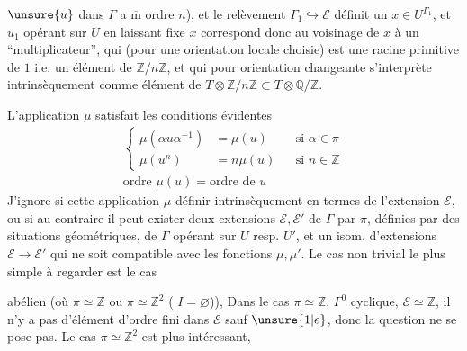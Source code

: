 
\(\unsure{u}\) dans \(\Gamma\) a \(\overline{\mathrm m}\) ordre \(n\)),
et le relèvement \(\Gamma_1\hookrightarrow\mathcal E\) définit un
\(x\in U^{\Gamma_1}\),  et \(u_1\) opérant sur \(U\)
en laissant fixe \(x\) correspond donc au voisinage de \(x\) à un
``multiplicateur'', qui (pour une orientation locale choisie) est une
racine primitive  de \(1\) i.e. un élément de
\(\mathbb Z/n\mathbb Z\), et qui pour orientation changeante
s'interprète intrinsèquement comme élément de
\(T\otimes\mathbb Z/n\mathbb Z
\subset T\otimes\mathbb Q/\mathbb Z\).

L'application \(\mu\) satisfait les conditions évidentes
\[
\begin{gathered}
\left\{
\begin{aligned}
\mu(\alpha u\alpha^{-1})&=\mu(u) &&\text{si }\alpha\in\pi\\
\mu(u^n)&=n\mu(u) &&\text{si }n\in\mathbb Z
\end{aligned}
\right.\\
\text{ordre }\mu(u)=\text{ordre de }u
\end{gathered}
\]
J'ignore si cette application \(\mu\) 
 définir intrinsèquement en termes de l'extension
\(\mathcal E\), ou si au contraire il peut exister deux extensions
 \(\mathcal E,\mathcal E'\) de \(\Gamma\) par \(\pi\),
définies par des situations géométriques, de \(\Gamma\) opérant sur
\(U\) resp. \(U'\), et un isom. d'extensions
\(\mathcal E\longrightarrow\mathcal E'\) qui ne soit compatible avec
les fonctions \(\mu,\mu'\).
Le cas non trivial le plus simple à regarder est le cas


abélien (où \(\pi\simeq\mathbb Z\)
ou \(\pi\simeq\mathbb Z^2\) ( \(I=\varnothing\))),
Dans le  cas
 \(\pi\simeq\mathbb Z\), 
\(\Gamma^0\) cyclique, \(\mathcal E\simeq\mathbb Z\),
il n'y a pas d'élément d'ordre fini dans \(\mathcal E\) sauf
\(\unsure{1|e}\), donc la question ne se pose pas.
Le cas \(\pi\simeq\mathbb Z^2\) est plus intéressant,

